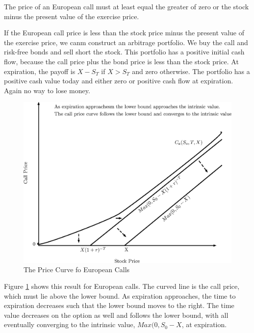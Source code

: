 \documentclass{book}
\theoremstyle{definition}
\theoremstyle{remark}
\begin{document}
        \begin{tcolorbox}[colback=blue!5!white,colframe=blue!75!black, title=Sticky Note]
            The price of an European call must at least equal the greater of zero or the stock minus the present value of the exercise price.
        \end{tcolorbox} 
            
            If the European call price is less than the stock price minus the present value of the exercise price, we canm construct an arbitrage portfolio. We buy the call and risk-free bonds and sell short the stock. This portfolio has a positive initial cash flow, because the call price plus the bond price is less than the stock price. At expiration, the payoff is $X - S_T$ if $X > S_T$ and zero otherwise. The portfolio has a positive cash value today and either zero or positive cash flow at expiration. Again no way to lose money. 
            
                \begin{figure}[h]
                    \centering
                        \includegraphics[scale=0.65]{images/fig:ECallExp.eps}
                    \caption{The Price Curve fo European Calls}
                    \label{fig:ECallExp}                
                \end{figure}
            
            Figure \ref{fig:ECallExp} shows this result for European calls. The curved line is the call price, which must lie above the lower bound. As expiration approaches, the time to expiration decreases such that the lower bound moves to the right. The time value decreases on the option as well and follows the lower bound, with all eventually converging to the intrinsic value, $Max(0, S_0 - X$, at expiration. 
            
\end{document}
